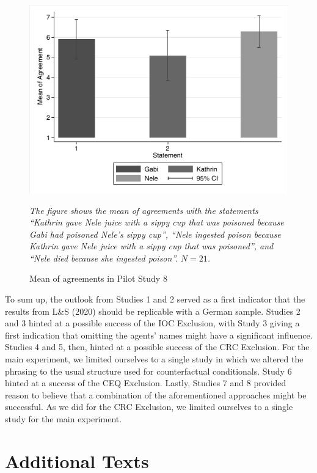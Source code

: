 \documentclass[egregdoesnotlikesansseriftitles,12pt]{scrartcl}
\begin{document}
\begin{figure}[H]
   \centering
   \includegraphics[scale=0.8]{figures/pilot_study_8.pdf}
   \begin{minipage}{0.9\linewidth}
   \footnotesize
   \emph{The figure shows the mean of agreements with the statements ``Kathrin gave Nele juice with a sippy cup that was poisoned because Gabi had poisoned Nele's sippy cup'', ``Nele ingested poison because Kathrin gave Nele juice with a sippy cup that was poisoned'', and ``Nele died because she ingested poison''. $N=21$.}
   \end{minipage}
   \caption{Mean of agreements in Pilot Study 8}
   \label{fig:pilot_study_8}
\end{figure}

\noindent To sum up, the outlook from Studies 1 and 2 served as a first indicator that the results from L\&S (2020) should be replicable with a German sample. Studies 2 and 3 hinted at a possible success of the IOC Exclusion, with Study 3 giving a first indication that omitting the agents' names might have a significant influence. Studies 4 and 5, then, hinted at a possible success of the CRC Exclusion. For the main experiment, we limited ourselves to a single study in which we altered the phrasing to the usual structure used for counterfactual conditionals. Study 6 hinted at a success of the CEQ Exclusion. Lastly, Studies 7 and 8 provided reason to believe that a combination of the aforementioned approaches might be successful. As we did for the CRC Exclusion, we limited ourselves to a single study for the main experiment.

\clearpage
\section{Additional Texts}\label{app:main_instructions}
\end{document}
